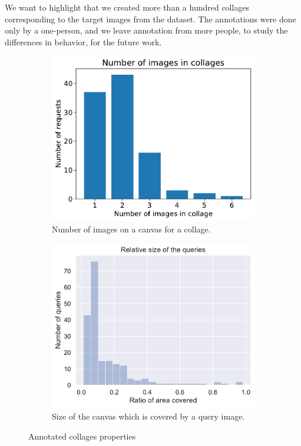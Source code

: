 We want to highlight that we created more than a hundred collages corresponding to the target images from the dataset.  The annotations were done only by a one-person, and we leave annotation from more people, to study the differences in behavior, for the future work. 

\begin{figure}
     \centering
     \begin{subfigure}[b]{0.48\textwidth}
         \centering
         \includegraphics[width=\textwidth]{graphs/num_queries_in_request.pdf}
         \caption{Number of images on a canvas for a collage.}
         \label{fig:y equals x}
     \end{subfigure}
     \hfill
     \begin{subfigure}[b]{0.48\textwidth}
         \centering
         \includegraphics[width=\textwidth]{graphs/queries_size.pdf}
         \caption{Size of the canvas which is covered by a query image.}
         \label{fig:three sin x}
     \end{subfigure}
    
    \caption{Annotated collages properties}
    \label{fig:annotated_dataset}
\end{figure}

